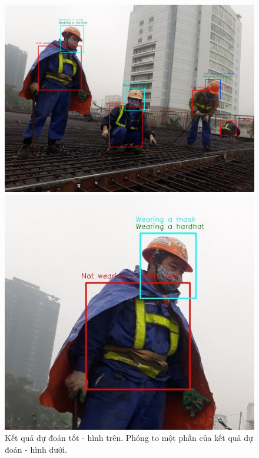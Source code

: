 \begin{figure}[ht!]
	\centerline{\includegraphics[scale=0.25]{images/result_1.jpg}}
	\centerline{\includegraphics[scale=0.6]{images/result_1a.jpg}}
  	\caption{Kết quả dự đoán tốt - hình trên. Phóng to một phần của kết quả dự đoán - hình dưới.}
  	\label{fig:precision_recall_map}
\end{figure}
